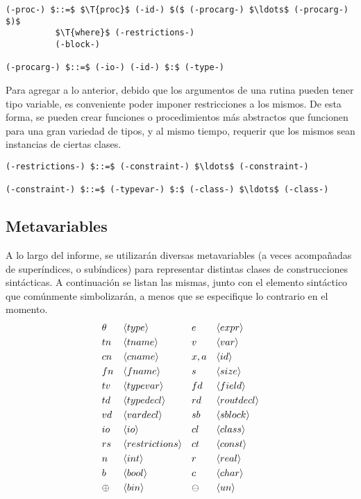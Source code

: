 \documentclass{article}
\begin{document}
\begin{lstlisting}[style = syntax]
(-proc-) $::=$ $\T{proc}$ (-id-) $($ (-procarg-) $\ldots$ (-procarg-) $)$
          $\T{where}$ (-restrictions-)
          (-block-)

(-procarg-) $::=$ (-io-) (-id-) $:$ (-type-)
\end{lstlisting}

Para agregar a lo anterior, debido que los argumentos de una rutina pueden tener tipo variable, es conveniente poder imponer restricciones a los mismos.
De esta forma, se pueden crear funciones o procedimientos más abstractos que funcionen para una gran variedad de tipos, y al mismo tiempo, requerir que los mismos sean instancias de ciertas clases.

\begin{lstlisting}[style = syntax]
(-restrictions-) $::=$ (-constraint-) $\ldots$ (-constraint-)

(-constraint-) $::=$ (-typevar-) $:$ (-class-) $\ldots$ (-class-)
\end{lstlisting}

\subsection{Metavariables}

A lo largo del informe, se utilizarán diversas metavariables (a veces acompañadas de superíndices, o subíndices) para representar distintas clases de construcciones sintácticas.
A continuación se listan las mismas, junto con el elemento sintáctico que comúnmente simbolizarán, a menos que se especifique lo contrario en el momento.
\begin{align*}
&\theta & &\langle type \rangle         &  &e       & &\langle expr \rangle     \\
&tn     & &\langle tname \rangle        &  &v       & &\langle var \rangle      \\
&cn     & &\langle cname \rangle        &  &x, a    & &\langle id \rangle       \\
&fn     & &\langle fname \rangle        &  &s       & &\langle size \rangle     \\ 
&tv     & &\langle typevar \rangle      &  &fd      & &\langle field \rangle    \\
&td     & &\langle typedecl \rangle     &  &rd      & &\langle routdecl \rangle \\
&vd     & &\langle vardecl \rangle      &  &sb      & &\langle sblock \rangle   \\
&io     & &\langle io \rangle           &  &cl      & &\langle class \rangle    \\
&rs     & &\langle restrictions \rangle &  &ct      & &\langle const \rangle    \\
&n      & &\langle int \rangle          &  &r       & &\langle real \rangle     \\
&b      & &\langle bool \rangle         &  &c       & &\langle char \rangle     \\
&\oplus & &\langle bin \rangle          &  &\ominus & &\langle un \rangle       \\
\end{align*}
\end{document}

